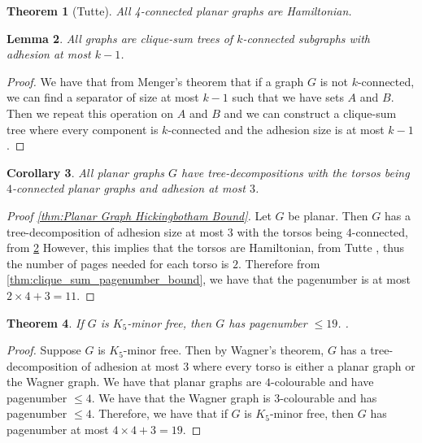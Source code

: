 \documentclass[]{report}
\newtheorem{theorem}{Theorem}
\newtheorem{corollary}[theorem]{Corollary}
\newtheorem{lemma}[theorem]{Lemma}
\theoremstyle{definition}
\numberwithin{theorem}{section}
\numberwithin{equation}{section}
\begin{document}
\begin{theorem}[Tutte\cite{tutteTheoremPlanarGraphs1956}]\label{thm:4-connected_planar_ham_cycle}
	All 4-connected planar graphs are Hamiltonian.
\end{theorem}

\begin{lemma}\label{lem:clique_sum_connected}
	All graphs are clique-sum trees of $k$-connected subgraphs with adhesion at most $k-1$.
\end{lemma}
\begin{proof}
	We have that from Menger's theorem that if a graph $G$ is not $k$-connected, we can find a separator of size at most $k-1$ such that we have sets $A$ and $B$. Then we repeat this operation on $A$ and $B$ and we can construct a clique-sum tree where every component is $k$-connected and the adhesion size is at most $k-1$. 
\end{proof}

\begin{corollary}\label{corr:planar_graphs_4_connected_cliqesums}
	All planar graphs $G$ have tree-decompositions with the torsos being $4$-connected planar graphs and adhesion at most $3$.
\end{corollary}


\begin{proof}[Proof \cref{thm:Planar Graph Hickingbotham Bound}]
	Let $G$ be planar. Then $G$ has a tree-decomposition of adhesion size at most $3$ with the torsos being $4$-connected, from \cref{lem:clique_sum_connected} However, this implies that the torsos are Hamiltonian, from Tutte \cite{tutteTheoremPlanarGraphs1956}, thus the number of pages needed for each torso is $2$. Therefore from \cref{thm:clique_sum_pagenumber_bound}, we have that the pagenumber is at most $2 \times 4 + 3 = 11$. 
\end{proof}

\begin{theorem}
	If $G$ is $K_5$-minor free, then $G$ has pagenumber $\leq 19$. .
\end{theorem}

\begin{proof}
	Suppose $G$ is $K_5$-minor free. Then by Wagner's theorem, $G$ has a tree-decomposition of adhesion at most 3 where every torso is either a planar graph or the Wagner graph.
	We have that planar graphs are $4$-colourable and have pagenumber $\leq 4$. We have that the Wagner graph is $3$-colourable and has pagenumber $\leq 4$. Therefore, we have that if $G$ is $K_5$-minor free, then $G$ has pagenumber at most $4 \times 4 + 3 = 19$. 
\end{proof}
\end{document}
